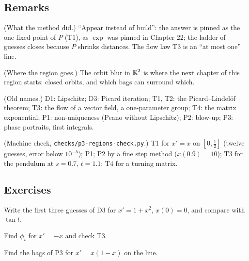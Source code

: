 \subsection*{Remarks}

\begin{lines}
\item[\lab{R1}] (What the method did.) ``Appear instead of build'': the answer is pinned as the one fixed point of $P$ (T1), as $\exp$ was pinned in Chapter 22; the ladder of guesses closes because $P$ shrinks distances. The flow law T3 is an ``at most one'' line.
\item[\lab{R2}] (Where the region goes.) The orbit blur in $\mathbb{R}^2$ is where the next chapter of this region starts: closed orbits, and which bags can surround which.
\item[\lab{R3}] (Old names.) D1: Lipschitz; D3: Picard iteration; T1, T2: the Picard--Lindel\"of theorem; T3: the flow of a vector field, a one-parameter group; T4: the matrix exponential; P1: non-uniqueness (Peano without Lipschitz); P2: blow-up; P3: phase portraits, first integrals.
\item[\lab{R4}] (Machine check, \texttt{checks/p3-regions-check.py}.) T1 for $x' = x$ on $[0, \tfrac12]$ (twelve guesses, error below $10^{-5}$); P1; P2 by a fine step method ($x(0.9) = 10$); T3 for the pendulum at $s = 0.7$, $t = 1.1$; T4 for a turning matrix.
\end{lines}

\subsection*{Exercises}

\begin{lines}
\item[\lab{E1}] Write the first three guesses of D3 for $x' = 1 + x^2$, $x(0) = 0$, and compare with $\tan t$.
\item[\lab{E2}] Find $\phi_t$ for $x' = -x$ and check T3.
\item[\lab{E3}] Find the bags of P3 for $x' = x(1 - x)$ on the line.
\end{lines}

\newpage


